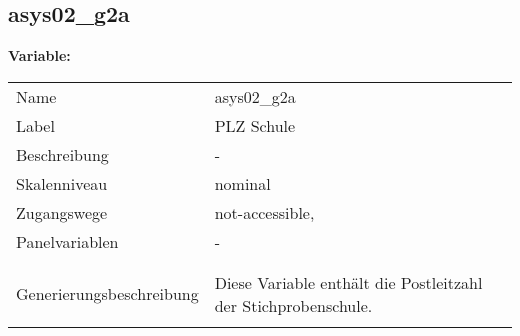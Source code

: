 	
	
	\subsection{asys02\_g2a}
	\label{subSection:asys02_g2a}

	\noindent\textbf{Variable:}\\
		\begin{tabular}{lL{11.3cm}}
			\label{tableVariable:asys02_g2a}
			Name & asys02\_g2a \\
			Label & PLZ Schule \\
			Beschreibung & - \\
			Skalenniveau & nominal \\
			Zugangswege &
				not-accessible,
 \\
			Panelvariablen & -
			 \\
			 \\
 \\
					Generierungsbeschreibung & Diese Variable enthält die Postleitzahl der Stichprobenschule.
				 \\	
			 \\
		\end{tabular}






	
	\newpage
